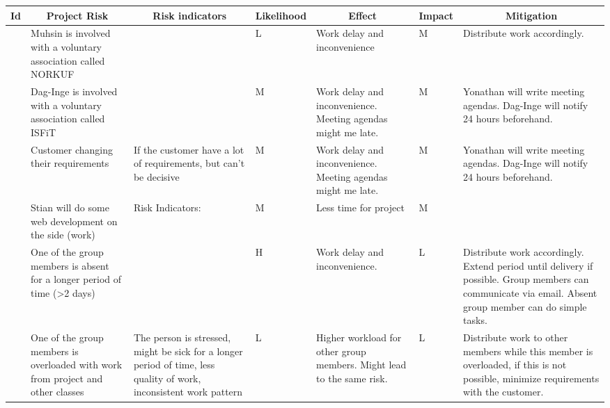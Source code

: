 \begin{landscape}

\centering
\begin{longtable}{| p{0.4cm} | p{4cm} | p{4cm} | p{2cm} | p{4cm} | p{1cm} | p{4cm} |}
	\hline
		\multicolumn{1}{|c|}{ Id}   &
        \multicolumn{1}{c|}{ Project Risk}  &
		\multicolumn{1}{c|}{ Risk indicators}  &
		\multicolumn{1}{c|}{ Likelihood} &
		\multicolumn{1}{c|}{ Effect} &
		\multicolumn{1}{c|}{ Impact} &
		\multicolumn{1}{c|}{ Mitigation} \\
		\hline \hline
	\endhead

	\newcounter{riskId}

	\stepcounter{riskId}
	\centering
		\arabic{riskId} &
        Muhsin is involved with a voluntary association called NORKUF &
		&
		\centering L &
		Work delay and inconvenience &
		\centering M &
		Distribute work accordingly. \\
	\hline

	\stepcounter{riskId}
	\centering
		\arabic{riskId} &
        Dag-Inge is involved with a voluntary association called ISFiT &
		& \centering M &
		Work delay and inconvenience. Meeting agendas might me late. &
		\centering  M &
		Yonathan will write meeting agendas. Dag-Inge will notify 24 hours beforehand. \\
	\hline

	\stepcounter{riskId}
	\centering
		\arabic{riskId} &
        Customer changing their requirements &
		If the customer have a lot of requirements, but can’t be decisive &
		\centering M &
		Work delay and inconvenience. Meeting agendas might me late. &
		\centering  M &
		Yonathan will write meeting agendas. Dag-Inge will notify 24 hours beforehand. \\
	\hline

	\stepcounter{riskId}
	\centering
		\arabic{riskId} &
        Stian will do some web development on the side (work) &
		Risk Indicators: &
		\centering M &
		Less time for project &
		\centering M & \\
	\hline

	\stepcounter{riskId}
	\centering
		\arabic{riskId} &
        One of the group members is absent for a longer period of time (>2 days) &
		& \centering H &
		Work delay and inconvenience. &
		\centering  L &
		Distribute work accordingly. Extend period until delivery if possible. Group members can communicate via email. Absent group member can do simple tasks. \\
	\hline

	\stepcounter{riskId}
	\centering
		\arabic{riskId} &
        One of the group members is overloaded with work from project and other classes &
		The person is stressed, might be sick for a longer period of time, less quality of work, inconsistent work pattern &
		\centering L &
		Higher workload for other group members. Might lead to the same risk. &
		\centering  L & Distribute work to other members while this member is overloaded, if this is not possible, minimize requirements with the customer. \\
	\hline


\end{longtable}
\end{landscape}
